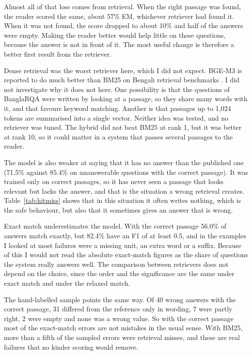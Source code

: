 Almost all of that loss comes from retrieval. When the right passage was found, the reader scored the same, about 57\% EM, whichever retriever had found it. When it was not found, the score dropped to about 10\% and half of the answers were empty. Making the reader better would help little on these questions, because the answer is not in front of it. The most useful change is therefore a better first result from the retriever.

Dense retrieval was the worst retriever here, which I did not expect. BGE-M3 is reported to do much better than BM25 on Bengali retrieval benchmarks \cite{chen2024bgem3}. I did not investigate why it does not here. One possibility is that the questions of BanglaRQA were written by looking at a passage, so they share many words with it, and that favours keyword matching. Another is that passages up to 1,024 tokens are summarised into a single vector. Neither idea was tested, and no retriever was tuned. The hybrid did not beat BM25 at rank 1, but it was better at rank 10, so it could matter in a system that passes several passages to the reader.

The model is also weaker at saying that it has no answer than the published one (71.5\% against 85.4\% on unanswerable questions with the correct passage). It was trained only on correct passages, so it has never seen a passage that looks relevant but lacks the answer, and that is the situation a wrong retrieval creates. Table~\ref{tab:hitmiss} shows that in this situation it often writes nothing, which is the safe behaviour, but also that it sometimes gives an answer that is wrong.

Exact match underestimates the model. With the correct passage 56.0\% of answers match exactly, but 82.4\% have an F1 of at least 0.5, and in the examples I looked at most failures were a missing unit, an extra word or a suffix. Because of this I would not read the absolute exact-match figures as the share of questions the system really answers well. The comparison between retrievers does not depend on the choice, since the order and the significance are the same under exact match and under the relaxed match.

The hand-labelled sample points the same way. Of 40 wrong answers with the correct passage, 31 differed from the reference only in wording, 7 were partly right, 2 were empty and none was a wrong value. So with the correct passage most of the exact-match errors are not mistakes in the usual sense. With BM25, more than a fifth of the sampled errors were retrieval misses, and these are real failures that no kinder scoring would remove.
